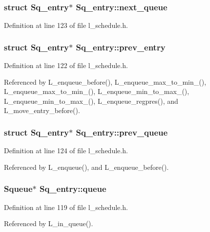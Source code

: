 \subsubsection{\setlength{\rightskip}{0pt plus 5cm}struct \bf{Sq\_\-entry}$\ast$ \bf{Sq\_\-entry::next\_\-queue}}\label{structSq__entry_2c602e3d1d923512028b6a8ad753d233}




Definition at line 123 of file l\_\-schedule.h.
\subsubsection{\setlength{\rightskip}{0pt plus 5cm}struct \bf{Sq\_\-entry}$\ast$ \bf{Sq\_\-entry::prev\_\-entry}}\label{structSq__entry_29d35af86ee481c92549514bc52986e9}




Definition at line 122 of file l\_\-schedule.h.

Referenced by L\_\-enqueue\_\-before(), L\_\-enqueue\_\-max\_\-to\_\-min\_(), L\_\-enqueue\_\-max\_\-to\_\-min\_(), L\_\-enqueue\_\-min\_\-to\_\-max\_(), L\_\-enqueue\_\-min\_\-to\_\-max\_(), L\_\-enqueue\_\-regpres(), and L\_\-move\_\-entry\_\-before().
\subsubsection{\setlength{\rightskip}{0pt plus 5cm}struct \bf{Sq\_\-entry}$\ast$ \bf{Sq\_\-entry::prev\_\-queue}}\label{structSq__entry_1c2bb8a676cf54b08704f36f2709877c}




Definition at line 124 of file l\_\-schedule.h.

Referenced by L\_\-enqueue(), and L\_\-enqueue\_\-before().
\subsubsection{\setlength{\rightskip}{0pt plus 5cm}\bf{Squeue}$\ast$ \bf{Sq\_\-entry::queue}}\label{structSq__entry_52d13b14a8db413a62a992c560815171}




Definition at line 119 of file l\_\-schedule.h.

Referenced by L\_\-in\_\-queue().
